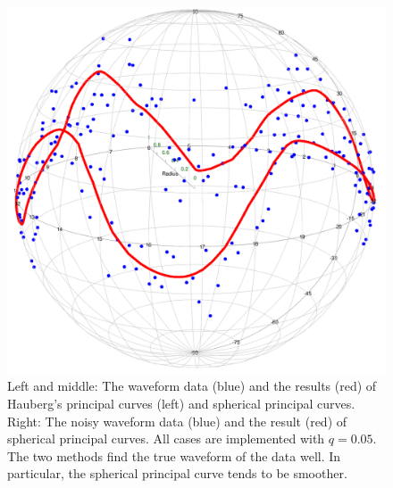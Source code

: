 \begin{figure}[h]
    \includegraphics[scale=0.105]{figures/SPC(wave_noisy).png}
    \caption{Left and middle: The waveform data (blue) and the results (red) of Hauberg's principal curves (left) and spherical principal curves. Right: The noisy waveform data (blue) and the result (red) of spherical principal curves. All cases are implemented with $q = 0.05$. The two methods find the true waveform of the data well. In particular, the spherical principal curve tends to be smoother.}
    \label{SPC:wave}
\end{figure}


